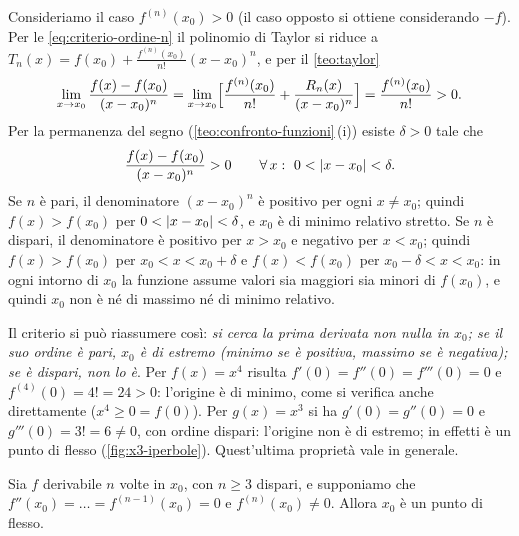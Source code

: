 \begin{dimostrazione}
Consideriamo il caso $f^{(n)}(x_{0})>0$ (il caso opposto si ottiene considerando $-f$).
Per le \eqref{eq:criterio-ordine-n} il polinomio di Taylor si riduce a
$T_{n}(x)=f(x_{0})+\frac{f^{(n)}(x_{0})}{n!}(x-x_{0})^{n}$, e per il \cref{teo:taylor}
\begin{equation}\label{eq:criterio-ordine-n-limite}
  \lim_{x\to x_{0}}\frac{f(x)-f(x_{0})}{(x-x_{0})^{n}}
  =\lim_{x\to x_{0}}\Bigl[\frac{f^{(n)}(x_{0})}{n!}+\frac{R_{n}(x)}{(x-x_{0})^{n}}\Bigr]
  =\frac{f^{(n)}(x_{0})}{n!}>0 .
\end{equation}
Per la permanenza del segno (\cref{teo:confronto-funzioni}\,(i)) esiste $\delta>0$ tale
che
\begin{equation}\label{eq:criterio-ordine-n-segno}
  \frac{f(x)-f(x_{0})}{(x-x_{0})^{n}}>0 \qquad\perogni x:\ 0<\abs{x-x_{0}}<\delta .
\end{equation}
Se $n$ è pari, il denominatore $(x-x_{0})^{n}$ è positivo per ogni $x\neq x_{0}$; quindi
$f(x)>f(x_{0})$ per $0<\lvert x-x_{0}\rvert<\delta$, e $x_{0}$ è di minimo relativo stretto. Se
$n$ è dispari, il denominatore è positivo per $x>x_{0}$ e negativo per $x<x_{0}$; quindi
$f(x)>f(x_{0})$ per $x_{0}<x<x_{0}+\delta$ e $f(x)<f(x_{0})$ per $x_{0}-\delta<x<x_{0}$:
in ogni intorno di $x_{0}$ la funzione assume valori sia maggiori sia minori di
$f(x_{0})$, e quindi $x_{0}$ non è né di massimo né di minimo relativo.
\end{dimostrazione}

Il criterio si può riassumere così: \emph{si cerca la prima derivata non nulla in
$x_{0}$; se il suo ordine è pari, $x_{0}$ è di estremo (minimo se è positiva, massimo se
è negativa); se è dispari, non lo è}. Per $f(x)=x^{4}$ risulta
$f'(0)=f''(0)=f'''(0)=0$ e $f^{(4)}(0)=4!=24>0$: l'origine è di minimo, come si verifica
anche direttamente ($x^{4}\ge0=f(0)$). Per $g(x)=x^{3}$ si ha $g'(0)=g''(0)=0$ e
$g'''(0)=3!=6\neq0$, con ordine dispari: l'origine non è di estremo; in effetti è un
punto di flesso (\cref{fig:x3-iperbole}). Quest'ultima proprietà vale in generale.

\begin{proposizione}\label{prop:flesso-ordine-n}
Sia $f$ derivabile $n$ volte in $x_{0}$, con $n\ge3$ dispari, e supponiamo che
$f''(x_{0})=\dots=f^{(n-1)}(x_{0})=0$ e $f^{(n)}(x_{0})\neq0$. Allora $x_{0}$ è un punto di
flesso.
\end{proposizione}

\begin{schema}
\end{schema}

